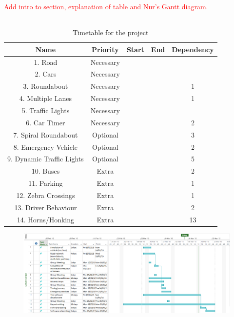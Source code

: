 \documentclass{article}
\begin{document}
\textcolor{red}{Add intro to section, explanation of table and Nur's Gantt diagram.}\\\\
\begin{table}[H]
	\centering
	\label{TimetableForTheProject}
\begin{tabular}{|c|c|c|c|c|}
	\hline {\bf Name} & {\bf Priority} & {\bf Start} & {\bf End} & {\bf Dependency} \\ 
	\hline 1. Road & Necessary &  &  &  \\ 
	\hline 2. Cars& Necessary &  &  &  \\ 
	\hline 3. Roundabout & Necessary &  &  & 1 \\ 
	\hline 4. Multiple Lanes & Necessary &  &  & 1 \\ 
	\hline 5. Traffic Lights & Necessary &  &  &  \\ 
	\hline 6.  Car Timer & Necessary &  &  & 2 \\ 
	\hline 7. Spiral Roundabout & Optional &  &  & 3 \\ 
	\hline 8. Emergency Vehicle & Optional &  &  & 2 \\ 
	\hline 9. Dynamic Traffic Lights & Optional &  &  & 5 \\ 
	\hline 10. Buses& Extra &  &  & 2 \\ 
	\hline  11. Parking & Extra &  &  & 1 \\ 
	\hline  12. Zebra Crossings & Extra &  &  & 1 \\ 
	\hline 13. Driver Behaviour & Extra &  &  & 2 \\ 
	\hline 14. Horns/Honking & Extra &  &  & 13 \\ 
	\hline 
\end{tabular} 
\caption{Timetable for the project}
\end{table}

\begin{figure}
	\centering
	\includegraphics[width=\textwidth]{"G Chart"}
\end{figure}
\end{document}
